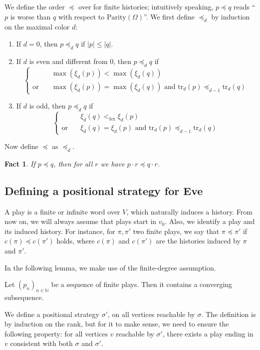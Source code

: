 \documentclass[11pt]{llncs}
\newcommand{\N}{\mathbb{N}}
\newcommand{\Parity}{\mathrm{Parity}}
\newcommand{\nN}{_{n \in \N}}
\newcommand{\lexstrict}{<_{\mathrm{lex}}}
\newcommand{\tr}{\mathrm{tr}}
\newtheorem{fact}{Fact}
\begin{document}
We define the order $\preceq$ over for finite histories;
intuitively speaking, $p \preceq q$ reads ``$p$ is worse than $q$ with respect to $\Parity(\Omega)$''.
We first define $\preceq_d$ by induction on the maximal color $d$:
\begin{enumerate}
	\item If $d = 0$, then $p \preceq_d q$ if $|p| \le |q|$.
	\item If $d$ is even and different from $0$, then $p \preceq_d q$ if 
$$\left\{
\begin{array}{ll}
		  & \max(\xi_d(p)) < \max(\xi_d(q))\\
\text{or}\quad & \max(\xi_d(p)) = \max(\xi_d(q)) \text{ and } \tr_d(p) \preceq_{d-1} \tr_d(q)
\end{array}
\right.$$
	\item If $d$ is odd, then $p \preceq_d q$ if 
$$\left\{
\begin{array}{ll}
		  & \xi_d(q) \lexstrict \xi_d(p)\\
\text{or}\quad & \xi_d(q) = \xi_d(p) \text{ and } \tr_d(p) \preceq_{d-1} \tr_d(q)
\end{array}
\right.$$
\end{enumerate}
Now define $\preceq$ as $\preceq_d$.

\begin{fact}\label{fact}
If $p \preceq q$, then for all $r$ we have $p \cdot r \preceq q \cdot r$.
\end{fact}

\subsection{Defining a positional strategy for Eve}

A play is a finite or infinite word over $V$, which naturally induces a history.
From now on, we will always assume that plays start in $v_0$.
Also, we identify a play and its induced history.
For instance, for $\pi,\pi'$ two finite plays, we say that $\pi \preceq \pi'$ if $c(\pi) \preceq c(\pi')$ holds,
where $c(\pi)$ and $c(\pi')$ are the histories induced by $\pi$ and $\pi'$.

In the following lemma, we make use of the finite-degree assumption.

\begin{lemma}\label{lem:compactness}
Let $(p_n)\nN$ be a sequence of finite plays.
Then it contains a converging subsequence.
\end{lemma}

We define a positional strategy $\sigma'$, on all vertices reachable by $\sigma$.
The definition is by induction on the rank, but for it to make sense, 
we need to ensure the following property:
for all vertices $v$ reachable by $\sigma'$, there exists a play ending in $v$
consistent with both $\sigma$ and $\sigma'$.
\end{document}
